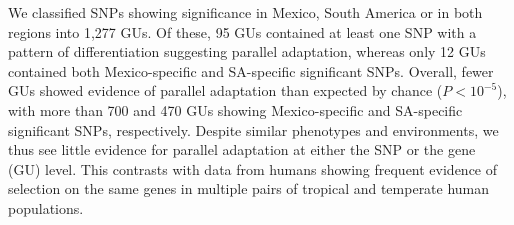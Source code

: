 {{We classified SNPs showing significance in Mexico, South America or in both regions into 1,277 GUs. 
Of these, 95 GUs contained at least one SNP with a pattern of differentiation suggesting parallel adaptation, whereas only 12 GUs contained both Mexico-specific and SA-specific significant SNPs. 
Overall, fewer GUs showed evidence of parallel adaptation than expected by chance ($P<10^{-5}$), with more than 700 and 470 GUs showing Mexico-specific and SA-specific significant SNPs, respectively.  
Despite similar phenotypes and environments, we thus see little evidence for parallel adaptation at either the SNP or the gene (GU) level.  
This contrasts with data from humans \citep{Tennessen_2011_21698142} showing frequent evidence of selection on the same genes in multiple pairs of tropical and temperate human populations.  




}}
